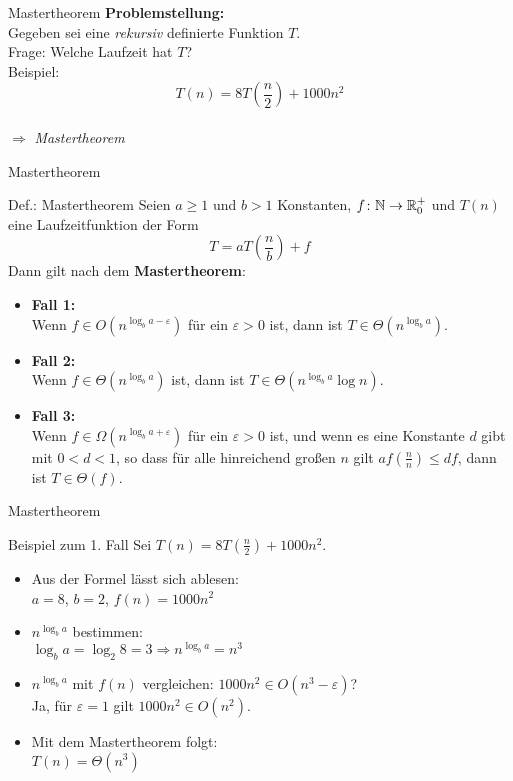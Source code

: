 \begin{frame}{Mastertheorem}
    \textbf{Problemstellung:}\\[1cm]    
    Gegeben sei eine \emph{rekursiv} definierte Funktion $T$.\\
    Frage: Welche Laufzeit hat $T$?\\[1cm]
    Beispiel:
    \[
    	T(n) = 8 T \left(\frac{n}{2} \right) + 1000n^2
    \]
    \\[1cm]\centering$\Rightarrow$ \emph{Mastertheorem}
\end{frame}

\begin{frame}{Mastertheorem}
    \begin{block}{Def.: Mastertheorem}
    	Seien $a\geq 1$ und $b>1$ Konstanten, $f \colon \mathbb{N} \to \mathbb{R}^+_0$ und $T(n)$ eine Laufzeitfunktion der Form
    	\[
			T = a T\left(\frac{n}{b}\right) + f 
		\]
		Dann gilt nach dem \textbf{Mastertheorem}:
		\begin{itemize}
			\item \textbf{Fall 1:} \\ Wenn $f \in O(n^{\log_b a -\varepsilon})$ für ein $\varepsilon>0$ ist, dann ist $T\in \Theta(n^{\log_b a})$.
			\item \textbf{Fall 2:} \\ Wenn $f \in \Theta(n^{\log_b a})$ ist, dann ist $T\in \Theta(n^{\log_b a}\log n)$.
			\item\textbf{Fall 3:} \\  Wenn $f \in \Omega(n^{\log_b a +\varepsilon})$ für ein $\varepsilon>0$ ist, und wenn es eine Konstante $d$ gibt mit $0<d<1$, so dass für alle hinreichend großen $n$ gilt $af\left(\frac{n}{n}\right)\leq d f$, dann ist $T\in \Theta(f)$.
		\end{itemize}
    \end{block}
\end{frame}

\begin{frame}{Mastertheorem}
    \begin{exampleblock}{Beispiel zum 1. Fall}
    	Sei $T(n) = 8 T \left(\frac{n}{2} \right) + 1000n^2$.
    	\begin{itemize}
    		\item Aus der Formel lässt sich ablesen:\\
    			$a=8$, $b=2$, $f(n)=1000n^2$
    		\item $n^{\log_b a}$ bestimmen:\\
    			$\log_b a = \log_2 8 = 3 \Rightarrow n^{\log_b a} = n^3$
    		\item $n^{\log_b a}$ mit $f(n)$ vergleichen: $1000n^2 \in O(n^3-\varepsilon)$?\\
    			Ja, für $\varepsilon = 1$ gilt $1000n^2 \in O(n^2)$.
    		\item Mit dem Mastertheorem folgt:\\
    			$T(n) = \Theta(n^3)$
    	\end{itemize}
    \end{exampleblock}
\end{frame}


